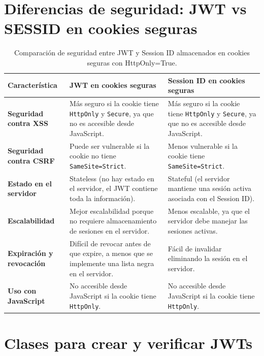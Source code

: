 \documentclass[a4paper,12pt]{report}
\begin{document}
		\section{Diferencias de seguridad: JWT vs SESSID en cookies seguras}
		\label{sec:anexo_JWTvsSESSIONS}
						
			\FloatBarrier
			\begin{table}[h]
				\centering
				\begin{tabular}{|p{4cm}|p{5cm}|p{5cm}|}
					\hline
					\textbf{Característica} & \textbf{JWT en cookies seguras} & \textbf{Session ID en cookies seguras} \\
					\hline
					\textbf{Seguridad contra XSS} & Más seguro si la cookie tiene \texttt{HttpOnly} y \texttt{Secure}, ya que no es accesible desde JavaScript. & Más seguro si la cookie tiene \texttt{HttpOnly} y \texttt{Secure}, ya que no es accesible desde JavaScript. \\
					\hline
					\textbf{Seguridad contra CSRF} & Puede ser vulnerable si la cookie no tiene \texttt{SameSite=Strict}. & Menos vulnerable si la cookie tiene \texttt{SameSite=Strict}. \\
					\hline
					\textbf{Estado en el servidor} & Stateless (no hay estado en el servidor, el JWT contiene toda la información). & Stateful (el servidor mantiene una sesión activa asociada con el Session ID). \\
					\hline
					\textbf{Escalabilidad} & Mejor escalabilidad porque no requiere almacenamiento de sesiones en el servidor. & Menos escalable, ya que el servidor debe manejar las sesiones activas. \\
					\hline
					\textbf{Expiración y revocación} & Difícil de revocar antes de que expire, a menos que se implemente una lista negra en el servidor. & Fácil de invalidar eliminando la sesión en el servidor. \\
					\hline
					\textbf{Uso con JavaScript} & No accesible desde JavaScript si la cookie tiene \texttt{HttpOnly}. & No accesible desde JavaScript si la cookie tiene \texttt{HttpOnly}. \\
					\hline
				\end{tabular}
				\caption{Comparación de seguridad entre JWT y Session ID almacenados en cookies seguras con HttpOnly=True.}
				\label{tab:jwt_vs_session}
			\end{table}
			\FloatBarrier
	
		\pagebreak
		
		
		\section{Clases para crear y verificar JWTs}
		\label{sec:anexoCreacionYverificacionJWT}
	
\end{document}
